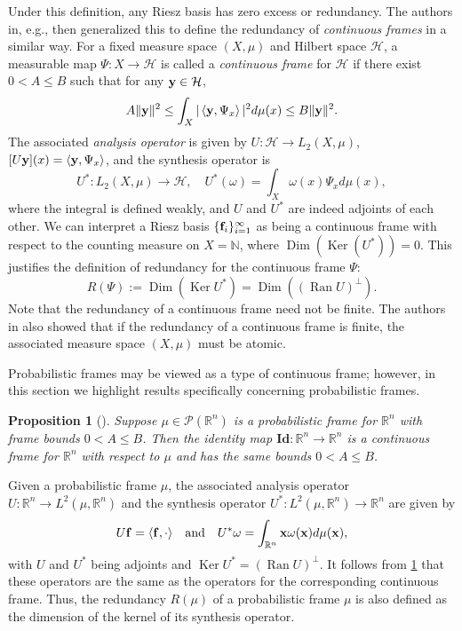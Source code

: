 \documentclass{amsart}
\numberwithin{equation}{section}
\DeclareMathOperator{\kernel}{Ker}
\DeclareMathOperator{\range}{Ran}
\DeclareMathOperator{\Dim}{Dim}
\newcommand\bof{{\bf f}}
\theoremstyle{plain}
\newtheorem{proposition}[theorem]{Proposition}
\theoremstyle{remark}
\theoremstyle{definition}
\begin{document}
Under this definition, any Riesz basis has zero excess or redundancy. The authors in, e.g., \cite{hemmat2001generalized,hosseini2013structure,jakobsen2016density, speckbacher2019frames}
then generalized this to define the redundancy of \emph{continuous frames} in a similar way. For a fixed measure space $(X,\mu)$ and Hilbert space $\mathcal{H}$, a measurable map $\Psi: X \rightarrow \mathcal{H}$ is called a \emph{continuous frame} for $\mathcal{H}$ if there exist $0 < A \leq B$ such that for any ${\bf y} \in \mathcal{H}$, 
$$ A \Vert {\bf y} \Vert^2 \leq  \int_X  \vert \left\langle {\bf y},\Psi_x \right\rangle \vert ^2 d\mu(x) \leq B \Vert {\bf y} \Vert^2.$$
The associated \emph{analysis operator} is given by
$U: \mathcal{H} \rightarrow L_2(X, \mu)$, $[U{\bf y}](x) = \left\langle {\bf y},\Psi_x \right\rangle$, and the synthesis operator is
$$U^\ast:  L_2(X, \mu) \rightarrow \mathcal{H}, \quad U^\ast(\omega) = \int_X \omega(x)\Psi_x d\mu(x),$$
where the integral is defined weakly, and $U$ and $U^\ast$ are indeed adjoints of each other.  We can interpret a Riesz basis $\{\bof_i\}_{i=1}^\infty$ as being a continuous frame with respect to the counting measure on $X =\mathbb{N}$, where $\Dim (\kernel(U^*))=0$.
This justifies the definition of redundancy for the continuous frame $\Psi$:
$$R(\Psi):= \Dim(\kernel U^\ast) = \Dim((\range U)^{\perp}). 
$$ 
Note that the redundancy of a continuous frame need not be finite. The authors in \cite{hemmat2001generalized,hosseini2013structure,jakobsen2016density,speckbacher2019frames} also showed that if the redundancy of a continuous frame is finite, the associated measure space $(X,\mu)$ must be atomic. 

Probabilistic frames may be viewed as a type of continuous frame; however, in this section we highlight results specifically concerning probabilistic frames.
\begin{proposition}[{\cite[Proposition 1.12]{wickman2014optimal}}] \label{ctsframe_and_probframe}
    Suppose $\mu \in  \mathcal{P}(\mathbb{R}^n)$ is a probabilistic frame for $\mathbb{R}^n$ with frame bounds $0<A \leq B$. Then the identity map $\mathbf{Id}: \mathbb{R}^n \rightarrow \mathbb{R}^n$
    is a continuous frame for $\mathbb{R}^n$ with respect to $\mu$ and has the same bounds $0<A \leq B$.
\end{proposition}

Given a probabilistic frame $\mu$, the associated analysis operator $U: \mathbb{R}^n \rightarrow L^2(\mu, \mathbb{R}^n)$ and the synthesis operator $U^*:  L^2(\mu, \mathbb{R}^n) \rightarrow \mathbb{R}^n$ are given by 
$$U {\bf f} = \langle {\bf f}, \cdot \rangle \quad  \textrm{and} \quad U^* \omega = \int_{\mathbb{R}^n} {\bf x} \omega ({\bf x}) d\mu({\bf x}),$$
with $U$ and $U^\ast$ being adjoints and $\kernel U^*= (\range U)^{\perp}$. It follows from \cref{ctsframe_and_probframe} that these operators are the same as the operators for the corresponding continuous frame.  Thus, the redundancy $R(\mu)$ of a probabilistic frame $\mu$ is also defined as the dimension of the kernel of its synthesis operator.
\end{document}
